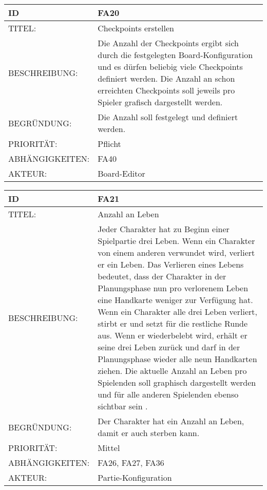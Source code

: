 \documentclass{uulm-assignment}
\begin{document}
    \begin{tabularx}{\textwidth}{|l|X |} \hline
        \textbf{ID} & \textbf{FA20} \\
        \hline
        TITEL: &  Checkpoints erstellen\\
        \hline
        BESCHREIBUNG: & 
         Die Anzahl der Checkpoints ergibt sich durch die festgelegten Board-Konfiguration und es dürfen beliebig viele Checkpoints definiert werden. Die Anzahl an schon erreichten Checkpoints soll jeweils pro Spieler grafisch dargestellt werden. 
        \\
        \hline
        BEGRÜNDUNG: & Die Anzahl soll festgelegt und definiert werden.\\
        \hline
        PRIORITÄT: & Pflicht\\
        \hline
        ABHÄNGIGKEITEN: & FA40\\
        \hline
        AKTEUR: & Board-Editor\\
        \hline
    \end{tabularx}
    
    \begin{tabularx}{\textwidth}{|l|X |} \hline
        \textbf{ID} & \textbf{FA21} \\
        \hline
        TITEL: & Anzahl an Leben \\
        \hline
        BESCHREIBUNG: & Jeder Charakter hat zu Beginn einer Spielpartie drei Leben. Wenn ein Charakter von einem anderen
verwundet wird, verliert er ein Leben. Das Verlieren eines Lebens bedeutet, dass der Charakter in der Planungsphase nun pro verlorenem Leben eine Handkarte weniger zur Verfügung hat.
\newline Wenn ein Charakter alle drei Leben verliert, stirbt er und setzt für die restliche Runde aus. Wenn er wiederbelebt wird, erhält er seine drei Leben zurück und darf in der Planungsphase wieder alle neun Handkarten ziehen.
\newline Die aktuelle Anzahl an Leben pro Spielenden soll graphisch dargestellt werden und für alle anderen Spielenden ebenso sichtbar sein .
        \\
        \hline
        BEGRÜNDUNG: & Der Charakter hat ein Anzahl an Leben, damit er auch sterben kann.\\
        \hline
        PRIORITÄT: & Mittel\\
        \hline
        ABHÄNGIGKEITEN: &  FA26, FA27, FA36\\
        \hline
        AKTEUR: & Partie-Konfiguration\\
        \hline
    \end{tabularx}
    
\end{document}
